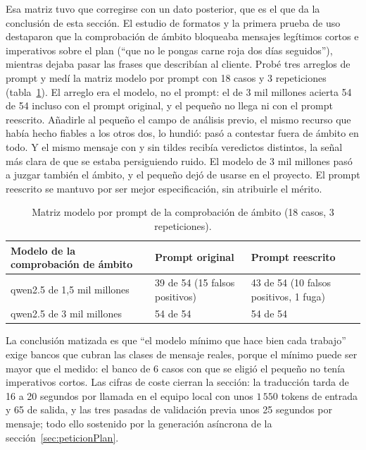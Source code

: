 Esa matriz tuvo que corregirse con un dato posterior, que es el que da la conclusión de esta sección. El estudio de formatos y la primera prueba de uso destaparon que la comprobación de ámbito bloqueaba mensajes legítimos cortos e imperativos sobre el plan (``que no le pongas carne roja dos días seguidos''), mientras dejaba pasar las frases que describían al cliente. Probé tres arreglos de prompt y medí la matriz modelo por prompt con 18 casos y 3 repeticiones (tabla~\ref{tab:matrizScope}). El arreglo era el modelo, no el prompt: el de 3 mil millones acierta 54 de 54 incluso con el prompt original, y el pequeño no llega ni con el prompt reescrito. Añadirle al pequeño el campo de análisis previo, el mismo recurso que había hecho fiables a los otros dos, lo hundió: pasó a contestar fuera de ámbito en todo. Y el mismo mensaje con y sin tildes recibía veredictos distintos, la señal más clara de que se estaba persiguiendo ruido. El modelo de 3 mil millones pasó a juzgar también el ámbito, y el pequeño dejó de usarse en el proyecto. El prompt reescrito se mantuvo por ser mejor especificación, sin atribuirle el mérito.

\begin{table}[htbp]
\centering
\small
\begin{tabular}{|p{4.4cm}|p{3.8cm}|p{4.6cm}|}
\hline
\textbf{Modelo de la comprobación de ámbito} & \textbf{Prompt original} & \textbf{Prompt reescrito} \\
\hline
qwen2.5 de 1,5 mil millones & 39 de 54 (15 falsos positivos) & 43 de 54 (10 falsos positivos, 1 fuga) \\
\hline
qwen2.5 de 3 mil millones & 54 de 54 & 54 de 54 \\
\hline
\end{tabular}
\caption{Matriz modelo por prompt de la comprobación de ámbito (18 casos, 3 repeticiones).}
\label{tab:matrizScope}
\end{table}

La conclusión matizada es que ``el modelo mínimo que hace bien cada trabajo'' exige bancos que cubran las clases de mensaje reales, porque el mínimo puede ser mayor que el medido: el banco de 6 casos con que se eligió el pequeño no tenía imperativos cortos. Las cifras de coste cierran la sección: la traducción tarda de 16 a 20 segundos por llamada en el equipo local con unos $1\,550$ tokens de entrada y 65 de salida, y las tres pasadas de validación previa unos 25 segundos por mensaje; todo ello sostenido por la generación asíncrona de la sección~\ref{sec:peticionPlan}.

